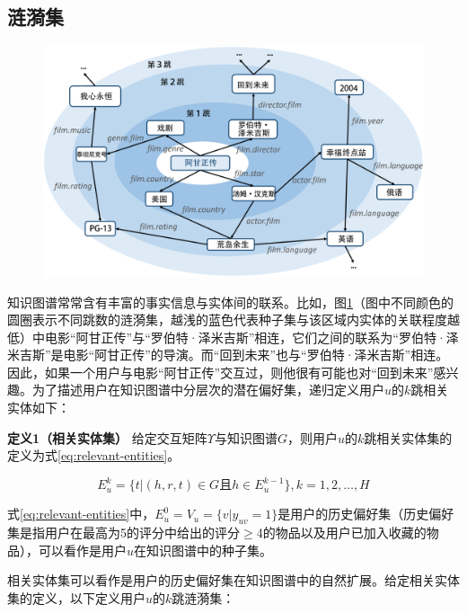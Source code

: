 \documentclass{bjfuthesis}
\begin{document}
\subsection{涟漪集}
\begin{figure}
	\includegraphics[width=\textwidth]{figures/illustration-of-ripple-sets.png}
	\label{fig:illustration-of-ripple-sets}
\end{figure}
知识图谱常常含有丰富的事实信息与实体间的联系。比如，图\ref{fig:illustration-of-ripple-sets}（图中不同颜色的圆圈表示不同跳数的涟漪集，越浅的蓝色代表种子集与该区域内实体的关联程度越低）中电影“阿甘正传”与“罗伯特·泽米吉斯”相连，它们之间的联系为“罗伯特·泽米吉斯”是电影“阿甘正传”的导演。而“回到未来”也与“罗伯特·泽米吉斯”相连。因此，如果一个用户与电影“阿甘正传”交互过，则他很有可能也对“回到未来”感兴趣。为了描述用户在知识图谱中分层次的潜在偏好集，递归定义用户$u$的$k$跳相关实体如下：

\textbf{定义1（相关实体集）} 给定交互矩阵$\Upsilon$与知识图谱$G$，则用户$u$的$k$跳相关实体集的定义为式\eqref{eq:relevant-entities}。

\begin{equation}
	E_u^k=\{t|(h, r, t)\in G \text{且} h\in E^{k-1}_u\}, k = 1, 2, \dots, H\label{eq:relevant-entities}
\end{equation}

式\eqref{eq:relevant-entities}中，$E_u^0=V_u=\{v | y_{uv}=1\}$是用户的历史偏好集（历史偏好集是指用户在最高为5的评分中给出的评分$\geqslant$4的物品以及用户已加入收藏的物品），可以看作是用户$u$在知识图谱中的种子集。

相关实体集可以看作是用户的历史偏好集在知识图谱中的自然扩展。给定相关实体集的定义，以下定义用户$u$的$k$跳涟漪集：
\end{document}
